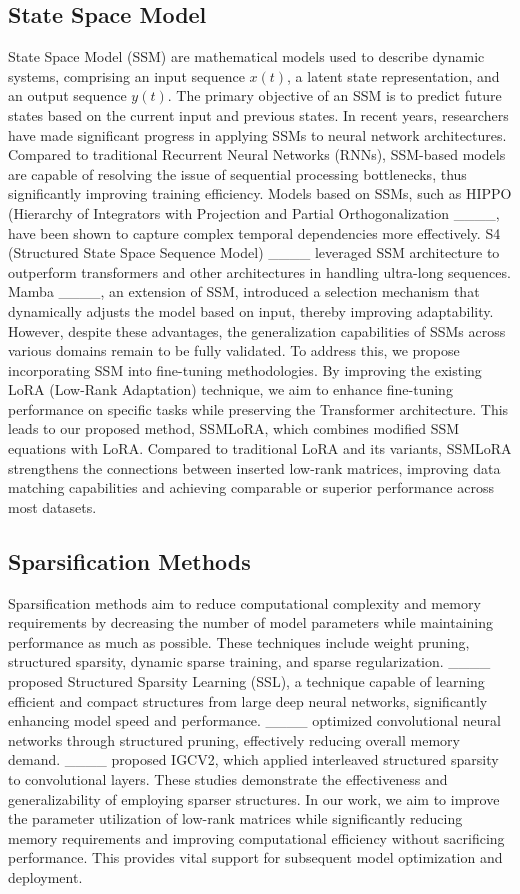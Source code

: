 \subsection{State Space Model}
State Space Model (SSM) are mathematical models used to describe dynamic systems, comprising an input sequence \( x(t) \), a latent state representation, and an output sequence \( y(t) \). The primary objective of an SSM is to predict future states based on the current input and previous states. In recent years, researchers have made significant progress in applying SSMs to neural network architectures. Compared to traditional Recurrent Neural Networks (RNNs), SSM-based models are capable of resolving the issue of sequential processing bottlenecks, thus significantly improving training efficiency. Models based on SSMs, such as HIPPO (Hierarchy of Integrators with Projection and Partial Orthogonalization ____, have been shown to capture complex temporal dependencies more effectively. S4 (Structured State Space Sequence Model) ____ leveraged SSM architecture to outperform transformers and other architectures in handling ultra-long sequences. Mamba ____, an extension of SSM, introduced a selection mechanism that dynamically adjusts the model based on input, thereby improving adaptability. However, despite these advantages, the generalization capabilities of SSMs across various domains remain to be fully validated. To address this, we propose incorporating SSM into fine-tuning methodologies. By improving the existing LoRA (Low-Rank Adaptation) technique, we aim to enhance fine-tuning performance on specific tasks while preserving the Transformer architecture. This leads to our proposed method, SSMLoRA, which combines modified SSM equations with LoRA. Compared to traditional LoRA and its variants, SSMLoRA strengthens the connections between inserted low-rank matrices, improving data matching capabilities and achieving comparable or superior performance across most datasets.

\subsection{Sparsification Methods}
Sparsification methods aim to reduce computational complexity and memory requirements by decreasing the number of model parameters while maintaining performance as much as possible. These techniques include weight pruning, structured sparsity, dynamic sparse training, and sparse regularization. ____ proposed Structured Sparsity Learning (SSL), a technique capable of learning efficient and compact structures from large deep neural networks, significantly enhancing model speed and performance. ____ optimized convolutional neural networks through structured pruning, effectively reducing overall memory demand. ____ proposed IGCV2, which applied interleaved structured sparsity to convolutional layers. These studies demonstrate the effectiveness and generalizability of employing sparser structures. In our work, we aim to improve the parameter utilization of low-rank matrices while significantly reducing memory requirements and improving computational efficiency without sacrificing performance. This provides vital support for subsequent model optimization and deployment.

%